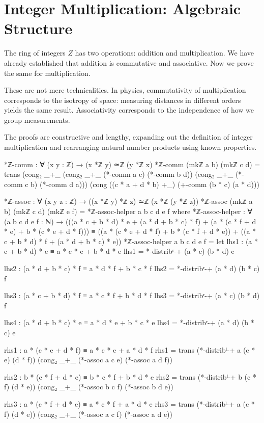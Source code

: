 \documentclass[11pt,a4paper]{book}
\def\mathbb#1{#1}%
\begin{document}
\section{Integer Multiplication: Algebraic Structure}

The ring of integers $\mathbb{Z}$ has two operations: addition and multiplication. 
We have already established that addition is commutative and associative. 
Now we prove the same for multiplication.

These are not mere technicalities. In physics, commutativity of multiplication corresponds to the isotropy of space: measuring distances in different orders yields the same result.
Associativity corresponds to the independence of how we group measurements.

The proofs are constructive and lengthy, expanding out the definition of integer multiplication and rearranging natural number products using known properties.

\begin{code}
*ℤ-comm : ∀ (x y : ℤ) → (x *ℤ y) ≃ℤ (y *ℤ x)
*ℤ-comm (mkℤ a b) (mkℤ c d) = 
  trans (cong₂ _+_ (cong₂ _+_ (*-comm a c) (*-comm b d)) 
                   (cong₂ _+_ (*-comm c b) (*-comm d a)))
        (cong ((c * a + d * b) +_) (+-comm (b * c) (a * d)))

*ℤ-assoc : ∀ (x y z : ℤ) → ((x *ℤ y) *ℤ z) ≃ℤ (x *ℤ (y *ℤ z))
*ℤ-assoc (mkℤ a b) (mkℤ c d) (mkℤ e f) =
  *ℤ-assoc-helper a b c d e f
  where
    *ℤ-assoc-helper : ∀ (a b c d e f : ℕ) →
      (((a * c + b * d) * e + (a * d + b * c) * f) + (a * (c * f + d * e) + b * (c * e + d * f)))
      ≡ ((a * (c * e + d * f) + b * (c * f + d * e)) + ((a * c + b * d) * f + (a * d + b * c) * e))
    *ℤ-assoc-helper a b c d e f = 
      let 
        lhs1 : (a * c + b * d) * e ≡ a * c * e + b * d * e
        lhs1 = *-distribʳ-+ (a * c) (b * d) e
        
        lhs2 : (a * d + b * c) * f ≡ a * d * f + b * c * f
        lhs2 = *-distribʳ-+ (a * d) (b * c) f
        
        lhs3 : (a * c + b * d) * f ≡ a * c * f + b * d * f
        lhs3 = *-distribʳ-+ (a * c) (b * d) f
        
        lhs4 : (a * d + b * c) * e ≡ a * d * e + b * c * e
        lhs4 = *-distribʳ-+ (a * d) (b * c) e
        
        rhs1 : a * (c * e + d * f) ≡ a * c * e + a * d * f
        rhs1 = trans (*-distribˡ-+ a (c * e) (d * f)) (cong₂ _+_ (*-assoc a c e) (*-assoc a d f))
        
        rhs2 : b * (c * f + d * e) ≡ b * c * f + b * d * e
        rhs2 = trans (*-distribˡ-+ b (c * f) (d * e)) (cong₂ _+_ (*-assoc b c f) (*-assoc b d e))
        
        rhs3 : a * (c * f + d * e) ≡ a * c * f + a * d * e
        rhs3 = trans (*-distribˡ-+ a (c * f) (d * e)) (cong₂ _+_ (*-assoc a c f) (*-assoc a d e))
\end{code}
\end{document}
